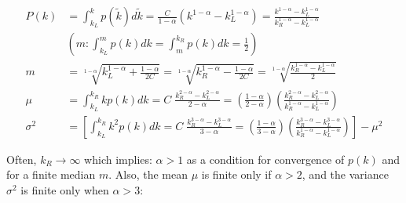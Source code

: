 \documentclass[10pt,letterpaper]{article}
\begin{document}
\begin{align}\label{eq:md}
	P(k) &=\int_{k_L}^k p(\tilde{k})d\tilde{k}=\frac{C}{1-\alpha}(k^{1-\alpha}-k_L^{1-\alpha})=
	\frac{k^{1-\alpha}-k_L^{1-\alpha}}{k_R^{1-\alpha}-k_L^{1-\alpha}}\nonumber\\
	&\left ( m : \int_{k_L}^{m}p(k)dk=\int_{m}^{k_R}p(k)dk=\frac{1}{2} \right )\nonumber\\
	m&=\sqrt[1-\alpha]{k_L^{1-\alpha}+\frac{1-\alpha}{2C}}=
	\sqrt[1-\alpha]{k_R^{1-\alpha}-\frac{1-\alpha}{2C}}=
	\sqrt[1-\alpha]{\frac{k_R^{1-\alpha}-k_L^{1-\alpha}}{2}}\\
	\mu &= \int_{k_L}^{k_R}kp(k)dk=C\;\frac{k_R^{2-\alpha}-k_L^{2-\alpha}}{2-\alpha}=\left(\frac{1-\alpha}{2-\alpha}\right)\left(\frac{k_R^{2-\alpha}-k_L^{2-\alpha}}{k_R^{1-\alpha}-k_L^{1-\alpha}}\right)\nonumber\\
	\sigma^2 &= \left[ \int_{k_L}^{k_R}k^2p(k)dk=C\;\frac{k_R^{3-\alpha}-k_L^{3-\alpha}}{3-\alpha} =\left(\frac{1-\alpha}{3-\alpha}\right)\left(\frac{k_R^{3-\alpha}-k_L^{3-\alpha}}{k_R^{1-\alpha}-k_L^{1-\alpha}}\right) \right] -\mu^2\nonumber
\end{align}

Often, $k_R\rightarrow \infty$ which implies: $\alpha>1$ as a condition for convergence of $p(k)$ and for a finite median $m$. Also,
the mean $\mu$ is finite only if $\alpha>2$, and the
variance $\sigma^2$ is finite only when $\alpha>3$:
\end{document}
